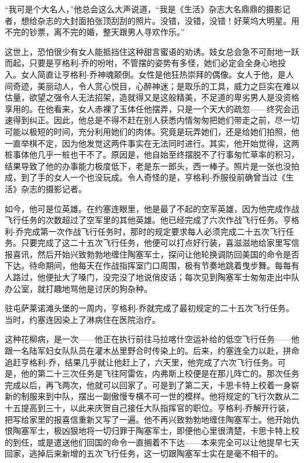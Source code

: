     “我可是个大名人，”他总会这么大声说道，“我是《生活》杂志大名鼎鼎的摄影记者，想给杂志的大封面拍张顶刮刮的照片。没错，没错，没错！好莱坞大明星。用不完的钞票，离不完的婚，整天跟男人寻欢作乐。”

    这世上，恐怕很少有女人能抵挡住这种甜言蜜语的劝诱。妓女总会急不可耐地一跃而起，只要是亨格利-乔的吩咐，不管摆的姿势有多怪，她们必定会全身心地投入。女人简直让亨格利-乔神魂颠倒。女性是他狂热崇拜的偶像。女人于他，是人间奇迹，美丽动人，令人赏心悦目，心醉神迷；是取乐的工具，威力之巨实在难以估量，欲望之强令人无法招架，造就得又是这般精美，不足道的卑劣男人是没资格享用的。在他看来，女人赤裸了玉体任他摆弄，只是一个天大的疏忽——终究会迅速得到纠正。因此，他总是不得不赶在别人获悉内情匆匆把她们带走之前，尽一切可能以极短的时间，充分利用她们的肉体。究竟是玩弄她们，还是给她们拍照，他一直举棋不定，因为他发觉这两件事实在无法同时进行。其实，他开始觉得，这两桩事体他几乎一桩也干不了。原因是，他自始至终摆脱不了行事匆忙草率的积习，结果导致了他的办事能力极度低下，老是东一郎头，西一棒子。照片是一张也没拍成，到了手的女人一个也没玩成。令人奇怪的是，亨格利-乔服役前确曾当过《生活》杂志的摄影记者。

 


    如今，他可是位英雄。在约塞连眼里，他是最了不起的空军英雄，因为他完成作战飞行任务的次数超过了空军里的其他英雄。他已经完成了六次作战飞行任务。亨格利-乔完成第一次作战飞行任务时，那时的规定要求每人必须完成二十五次飞行任务。只要完成了这二十五次飞行任务，他便可以打点好行装，喜滋滋地给家里写信报喜讯，然后开始兴致勃勃地缠住陶塞军士，探问让他轮换调防回美国的命令是否下达。待命期间，他每天在作战指挥室门口周围，极有节奏地跳着曳步舞。每每有人路过，他便扯大了嗓门，没完没了地说俏皮话；每次见到陶塞军士匆匆走出中队办公室，就打趣地骂他是讨厌的狗杂种。

    驻屯萨莱诺滩头堡的一周内，亨格利-乔就完成了最初规定的二十五次飞行任务。当时，约塞连因染上了淋病住在医院治疗。

    这种花柳病，是一次——他正在执行前往马拉喀什空运补给的低空飞行任务——他跟一名陆军妇女队队员在灌木丛里野合时传染上的。后来，约塞连全力以赴，拼命追赶亨格利-乔，结果几乎就让他赶上了，六天里，他完成了六次飞行任务。可是，他的第二十三次任务是飞往阿雷佐，内弗斯上校便是在那儿阵亡的。那次任务完成以后，再飞两次，他就可以回家了。可是到了第二天，卡思卡特上校着一身崭新的制服来到中队，摆出一副傲慢专横不可一世的模样。他将规定的飞行次数从二十五提高到三十，以此来庆贺自己接任大队指挥官的职位。亨格利-乔解开行装，把写给家里的报喜信重新又写了一遍。他不再兴致勃勃地缠住陶塞军士。他开始仇恨陶塞军士，极凶狠地将一切归罪于陶塞军士，即便他心里很清楚，卡思卡特上校的到任，或是遣送他们回国的命令一直搁着不下达——本来完全可以让他提早七天回家，逃掉后来新增的五次飞行任务，这一切跟陶塞军士实在是毫不相干的。

